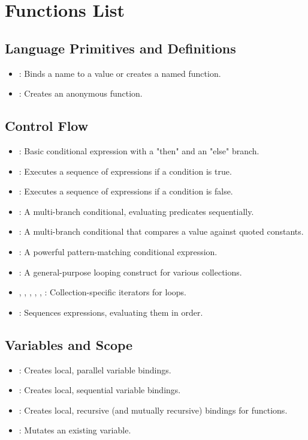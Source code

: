 \section{Functions List}

\subsection{Language Primitives and Definitions}
\begin{itemize}
    \item {}: Binds a name to a value or creates a named function.
    \item {}: Creates an anonymous function.
\end{itemize}

\subsection{Control Flow}
\begin{itemize}
    \item {}: Basic conditional expression with a "then" and an "else" branch.
    \item {}: Executes a sequence of expressions if a condition is true.
    \item {}: Executes a sequence of expressions if a condition is false.
    \item {}: A multi-branch conditional, evaluating predicates sequentially.
    \item {}: A multi-branch conditional that compares a value against quoted constants.
    \item {}: A powerful pattern-matching conditional expression.
    \item {}: A general-purpose looping construct for various collections.
    \item {}, , , , , : Collection-specific iterators for  loops.
    \item {}: Sequences expressions, evaluating them in order.
\end{itemize}

\subsection{Variables and Scope}
\begin{itemize}
    \item {}: Creates local, parallel variable bindings.
    \item {}: Creates local, sequential variable bindings.
    \item {}: Creates local, recursive (and mutually recursive) bindings for functions.
    \item {}: Mutates an existing variable.
\end{itemize}

